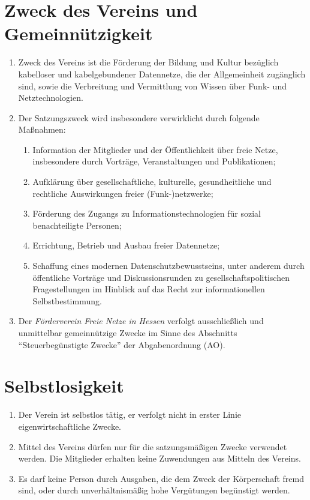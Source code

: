 \documentclass[ngerman]{article}
\newcommand{\NameVerein}{Förderverein Freie Netze in Hessen}
\begin{document}
\section{Zweck des Vereins und Gemeinnützigkeit}
\begin{enumerate}
  \item Zweck des Vereins ist die Förderung der Bildung und Kultur bezüglich kabelloser und kabelgebundener Datennetze, die der Allgemeinheit zugänglich sind, sowie die Verbreitung und Vermittlung von Wissen über Funk- und Netztechnologien.
  \item Der Satzungszweck wird insbesondere verwirklicht durch folgende Maßnahmen:
  \begin{enumerate}
    \item Information der Mitglieder und der Öffentlichkeit über freie Netze, insbesondere durch Vorträge, Veranstaltungen und Publikationen;
    \item Aufklärung über gesellschaftliche, kulturelle, gesundheitliche und rechtliche Auswirkungen freier (Funk-)netzwerke;
    \item Förderung des Zugangs zu Informationstechnologien für sozial benachteiligte Personen;
    \item Errichtung, Betrieb und Ausbau freier Datennetze;
    \item Schaffung eines modernen Datenschutzbewusstseins, unter anderem durch öffentliche Vorträge und Diskussionsrunden zu gesellschaftspolitischen Fragestellungen im Hinblick auf das Recht zur informationellen Selbstbestimmung.
  \end{enumerate}
  \item Der \emph{\NameVerein} verfolgt ausschließlich und unmittelbar gemeinnützige Zwecke im Sinne des Abschnitts "`Steuerbegünstigte Zwecke"' der Abgabenordnung (AO).
\end{enumerate}


\section{Selbstlosigkeit}
\begin{enumerate}
  \item Der Verein ist selbstlos tätig, er verfolgt nicht in erster Linie eigenwirtschaftliche Zwecke.
  \item Mittel des Vereins dürfen nur für die satzungsmäßigen Zwecke verwendet werden. Die Mitglieder erhalten keine Zuwendungen aus Mitteln des Vereins.
  \item Es darf keine Person durch Ausgaben, die dem Zweck der Körperschaft fremd sind, oder durch unverhältnismäßig hohe Vergütungen begünstigt werden.
\end{enumerate}
\end{document}
